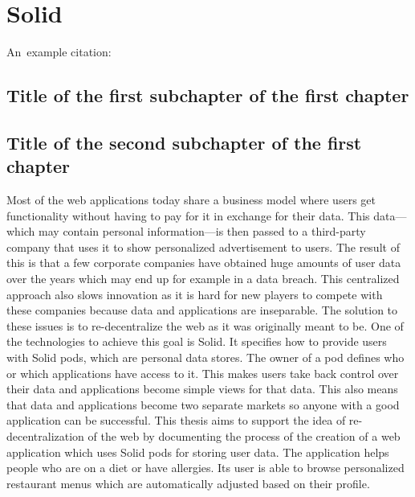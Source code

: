 \chapter{Solid}

An~example citation: \cite{Andel07}

\section{Title of the first subchapter of the first chapter}

\section{Title of the second subchapter of the first chapter}

Most of the web applications today share a business model where users get functionality without having to pay for it in exchange for their data.
This data---which may contain personal information---is then passed to a third-party company that uses it to show personalized advertisement to users. 
The result of this is that a few corporate companies have obtained huge amounts of user data over the years which may end up for example in a data breach. 
This centralized approach also slows innovation as it is hard for new players to compete with these companies because data and applications are inseparable. 
The solution to these issues is to re-decentralize the web as it was originally meant to be. 
One of the technologies to achieve this goal is Solid. 
It specifies how to provide users with Solid pods, which are personal data stores. 
The owner of a pod defines who or which applications have access to it. 
This makes users take back control over their data and applications become simple views for that data. 
This also means that data and applications become two separate markets so anyone with a good application can be successful. 
This thesis aims to support the idea of re-decentralization of the web by documenting the process of the creation of a web application which uses Solid pods for storing user data. 
The application helps people who are on a diet or have allergies. 
Its user is able to browse personalized restaurant menus which are automatically adjusted based on their profile.